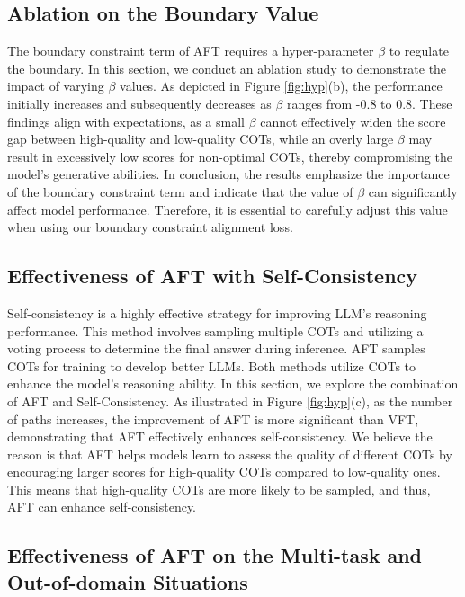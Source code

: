 \subsection{Ablation on the Boundary Value} The boundary constraint term of AFT requires a hyper-parameter $\beta$ to regulate the boundary. In this section, we conduct an ablation study to demonstrate the impact of varying $\beta$  values. As depicted in Figure \ref{fig:hyp}(b), the performance initially increases and subsequently decreases as $\beta$ ranges from -0.8 to 0.8. These findings align with expectations, as a small $\beta$ cannot effectively widen the score gap between high-quality and low-quality COTs, while an overly large $\beta$ may result in excessively low scores for non-optimal COTs, thereby compromising the model's generative abilities. In conclusion, the results emphasize the importance of the boundary constraint term and indicate that the value of $\beta$ can significantly affect model performance. Therefore, it is essential to carefully adjust this value when using our boundary constraint alignment loss.

\subsection{Effectiveness of AFT with Self-Consistency}

Self-consistency is a highly effective strategy for improving LLM's reasoning performance.  This method involves sampling multiple COTs and utilizing a voting process to determine the final answer during inference. AFT samples COTs for training to develop better LLMs. Both methods utilize COTs to enhance the model's reasoning ability. In this section, we explore the combination of AFT and Self-Consistency. As illustrated in Figure \ref{fig:hyp}(c), as the number of paths increases, the improvement of AFT is more significant than VFT, demonstrating that AFT effectively enhances self-consistency. We believe the reason is that AFT helps models learn to assess the quality of different COTs by encouraging larger scores for high-quality COTs compared to low-quality ones. This means that high-quality COTs are more likely to be sampled, and thus, AFT can enhance self-consistency.

\subsection{Effectiveness of AFT on the Multi-task and Out-of-domain Situations} 

